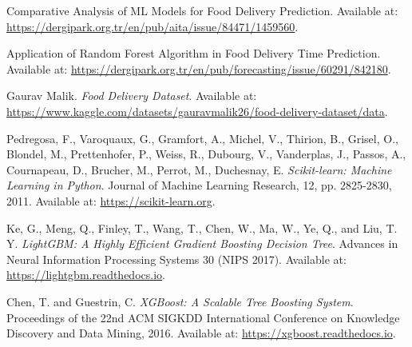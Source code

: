 \documentclass[10pt,twocolumn,letterpaper]{article}
\begin{document}
\begin{thebibliography}{9}
    
        Comparative Analysis of ML Models for Food Delivery Prediction.
        Available at: \url{https://dergipark.org.tr/en/pub/aita/issue/84471/1459560}.
    
        Application of Random Forest Algorithm in Food Delivery Time Prediction.
        Available at: \url{https://dergipark.org.tr/en/pub/forecasting/issue/60291/842180}.
    
        Gaurav Malik.
        \emph{Food Delivery Dataset}.
        Available at: \url{https://www.kaggle.com/datasets/gauravmalik26/food-delivery-dataset/data}.
    
        Pedregosa, F., Varoquaux, G., Gramfort, A., Michel, V., Thirion, B., Grisel, O., Blondel, M., Prettenhofer, P., Weiss, R., Dubourg, V., Vanderplas, J., Passos, A., Cournapeau, D., Brucher, M., Perrot, M., Duchesnay, E.
        \emph{Scikit-learn: Machine Learning in Python}.
        Journal of Machine Learning Research, 12, pp. 2825-2830, 2011.
        Available at: \url{https://scikit-learn.org}.
    
        Ke, G., Meng, Q., Finley, T., Wang, T., Chen, W., Ma, W., Ye, Q., and Liu, T. Y.
        \emph{LightGBM: A Highly Efficient Gradient Boosting Decision Tree}.
        Advances in Neural Information Processing Systems 30 (NIPS 2017).
        Available at: \url{https://lightgbm.readthedocs.io}.
    
        Chen, T. and Guestrin, C.
        \emph{XGBoost: A Scalable Tree Boosting System}.
        Proceedings of the 22nd ACM SIGKDD International Conference on Knowledge Discovery and Data Mining, 2016.
        Available at: \url{https://xgboost.readthedocs.io}.
    
\end{thebibliography}
\end{document}
